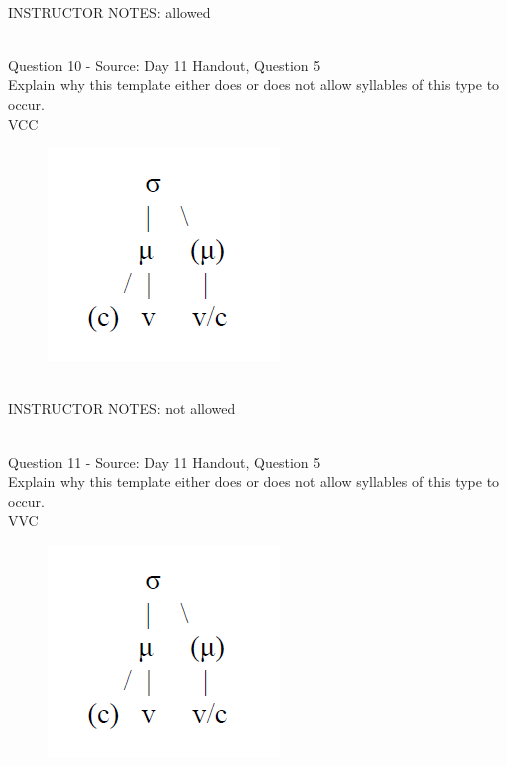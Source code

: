 \documentclass[12pt]{article}
\begin{document}
~\\
INSTRUCTOR NOTES: allowed


~\\

{\large Question 10} - Source: Day 11 Handout, Question 5\\

Explain why this template either does or does not allow syllables of this type to occur.\\

VCC

\begin{figure}[H]
\includegraphics{../images/ponapean_syllabletemplate.png}
\end{figure}

~\\
INSTRUCTOR NOTES: not allowed


~\\

{\large Question 11} - Source: Day 11 Handout, Question 5\\

Explain why this template either does or does not allow syllables of this type to occur.\\

VVC

\begin{figure}[H]
\includegraphics{../images/ponapean_syllabletemplate.png}
\end{figure}
\end{document}
